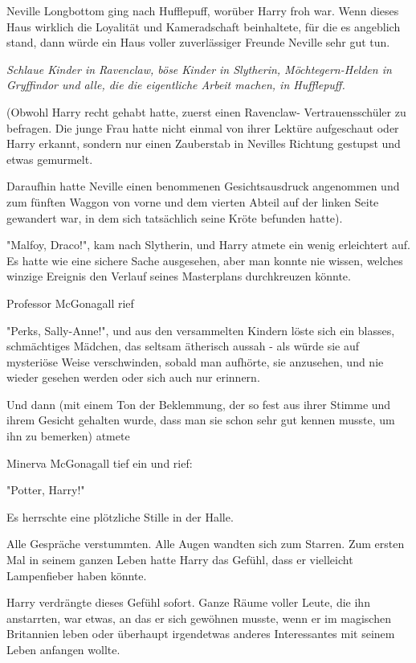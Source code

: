 {Neville Longbottom ging nach Hufflepuff, worüber Harry froh war. Wenn dieses Haus wirklich die Loyalität und Kameradschaft beinhaltete, für die es angeblich stand, dann würde ein Haus voller zuverlässiger Freunde Neville sehr gut tun.

\emph{Schlaue Kinder in Ravenclaw, böse Kinder in Slytherin, Möchtegern-Helden in Gryffindor und alle, die die eigentliche Arbeit machen, in Hufflepuff.}

(Obwohl Harry recht gehabt hatte, zuerst einen Ravenclaw- Vertrauensschüler zu befragen. Die junge Frau hatte nicht einmal von ihrer Lektüre aufgeschaut oder Harry erkannt, sondern nur einen Zauberstab in Nevilles Richtung gestupst und etwas gemurmelt.

Daraufhin hatte Neville einen benommenen Gesichtsausdruck angenommen und zum fünften Waggon von vorne und dem vierten Abteil auf der linken Seite gewandert war, in dem sich tatsächlich seine Kröte befunden hatte).

"Malfoy, Draco!", kam nach Slytherin, und Harry atmete ein wenig erleichtert auf. Es hatte wie eine sichere Sache ausgesehen, aber man konnte nie wissen, welches winzige Ereignis den Verlauf seines Masterplans durchkreuzen könnte.

Professor McGonagall rief

"Perks, Sally-Anne!", und aus den versammelten Kindern löste sich ein blasses, schmächtiges Mädchen, das seltsam ätherisch aussah - als würde sie auf mysteriöse Weise verschwinden, sobald man aufhörte, sie anzusehen, und nie wieder gesehen werden oder sich auch nur erinnern.

Und dann (mit einem Ton der Beklemmung, der so fest aus ihrer Stimme und ihrem Gesicht gehalten wurde, dass man sie schon sehr gut kennen musste, um ihn zu bemerken) atmete

Minerva McGonagall tief ein und rief:

"Potter, Harry!"

Es herrschte eine plötzliche Stille in der Halle.

Alle Gespräche verstummten. Alle Augen wandten sich zum Starren. Zum ersten Mal in seinem ganzen Leben hatte Harry das Gefühl, dass er vielleicht Lampenfieber haben könnte.

Harry verdrängte dieses Gefühl sofort. Ganze Räume voller Leute, die ihn anstarrten, war etwas, an das er sich gewöhnen musste, wenn er im magischen Britannien leben oder überhaupt irgendetwas anderes Interessantes mit seinem Leben anfangen wollte.

}
